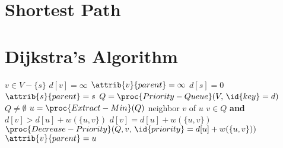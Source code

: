 \section{Shortest Path}

\section{Dijkstra's Algorithm}

\begin{codebox}
    \li \For $v \in V - \{s\}$ \Do
        \li $d[v] = \infty$
        \li $\attrib{v}{parent} = \infty$
        \End
    \li $d[s] = 0$
    \li $\attrib{s}{parent} = s$
    \li $Q = \proc{Priority-Queue}(V,\, \id{key}=d)$
    \li \While $Q \neq \emptyset$ \Do
        \li $u = \proc{Extract-Min}(Q)$
        \li \For neighbor $v$ of $u$ \Do
            \li \If $v \in Q$ \textbf{and} $d[v] > d[u] + w(\{u,v\})$ \Then
                \li $d[v] = d[u] + w(\{u,v\})$
                \li $\proc{Decrease-Priority}(Q,v,\, \id{priority}=d[u]+w(\{u,v\}))$
                \li $\attrib{v}{parent} = u$   
\end{codebox}